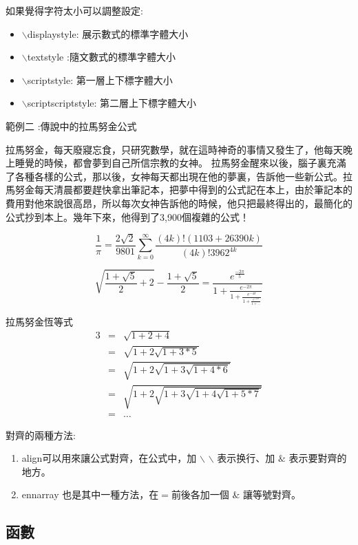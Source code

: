 \bigskip
如果覺得字符太小可以調整設定:
\begin{itemize}

\item$\backslash${\A displaystyle}:	展示數式的標準字體大小
\item$\backslash${\A textstyle}	:隨文數式的標準字體大小
\item$\backslash${\A scriptstyle}:	第一層上下標字體大小
\item$\backslash${\A scriptscriptstyle}:	第二層上下標字體大小
\end{itemize}
\bigskip
範例二 :傳說中的拉馬努金公式
\bigskip

拉馬努金，每天廢寢忘食，只研究數學，就在這時神奇的事情又發生了，他每天晚上睡覺的時候，都會夢到自己所信宗教的女神。 拉馬努金醒來以後，腦子裏充滿了各種各樣的公式，那以後，女神每天都出現在他的夢裏，告訴他一些新公式。拉馬努金每天清晨都要趕快拿出筆記本，把夢中得到的公式記在本上，由於筆記本的費用對他來說很高昂，所以每次女神告訴他的時候，他只把最終得出的，最簡化的公式抄到本上。幾年下來，他得到了3,900個複雜的公式！ 

\bigskip
$$
\nonumber\frac{1}{\pi}=\frac{2\sqrt{2}}{9801}\sum_{k=0}^\infty{\frac{(4k)!(1103+26390k)}{(4k)!3962^{4k}}}
$$

$$
\nonumber\sqrt{\frac{1+\sqrt{5}}{2}+2}-\frac{1+\sqrt{5}}{2}=\frac{\displaystyle e^{\frac{-2\pi}{5}}}{1+\frac{\displaystyle e^{-2\pi}}{1+\frac{\displaystyle e^{-4\pi}}{1+\frac{\displaystyle e^{-6\pi}}{1+\ldots}}}}
$$

拉馬努金恆等式
\begin{eqnarray}
        \nonumber 3&=&\sqrt{1+2+4} \\
        \nonumber &=& \sqrt{1+2\sqrt{1+3*5}} \\
        \nonumber &=& \sqrt{1+2\sqrt{1+3\sqrt{1+4*6}}} \\
        \nonumber  &=& \sqrt{1+2\sqrt{1+3\sqrt{1+4\sqrt{1+5*7}}}} \\
        \nonumber &=& \ldots
\end{eqnarray}

對齊的兩種方法:
\begin{enumerate}
\item align可以用來讓公式對齊，在公式中，加 $\backslash$ $\backslash$ 表示换行、加 $\&$ 表示要對齊的地方。
\item ennarray 也是其中一種方法，在$ = $前後各加一個 $\&$ 讓等號對齊。
\end{enumerate}


\subsection{函數}

